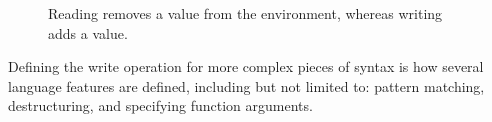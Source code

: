\documentclass[12pt,twoside]{report}
\begin{document}
\begin{figure}[H]
  \begin{mathpar}

  \end{mathpar}
  \caption{Reading removes a value from the environment, whereas writing adds a value.}
\end{figure}
\vspace{-5ex}
\noindent
Defining the write operation for more complex pieces of syntax is how several language features are defined, including but not limited to: pattern matching, destructuring, and specifying function arguments.



\end{document}
